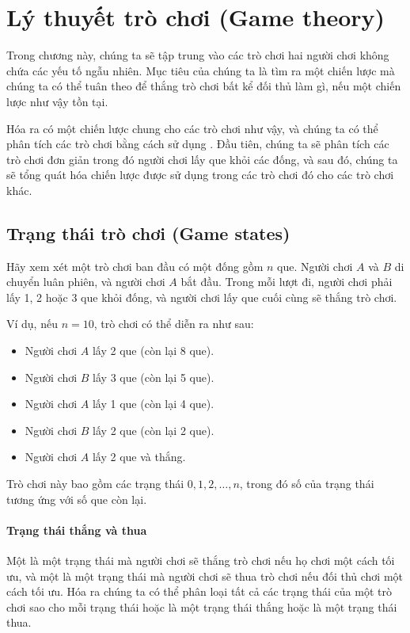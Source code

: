 \chapter{Lý thuyết trò chơi (Game theory)}

Trong chương này, chúng ta sẽ tập trung vào các trò chơi
hai người chơi không chứa các yếu tố ngẫu nhiên.
Mục tiêu của chúng ta là tìm ra một chiến lược mà chúng ta có thể
tuân theo để thắng trò chơi
bất kể đối thủ làm gì,
nếu một chiến lược như vậy tồn tại.

Hóa ra có một chiến lược chung
cho các trò chơi như vậy,
và chúng ta có thể phân tích các trò chơi bằng cách sử dụng .
Đầu tiên, chúng ta sẽ phân tích các trò chơi đơn giản trong đó
người chơi lấy que khỏi các đống,
và sau đó, chúng ta sẽ tổng quát hóa chiến lược
được sử dụng trong các trò chơi đó cho các trò chơi khác.

\section{Trạng thái trò chơi (Game states)}

Hãy xem xét một trò chơi ban đầu có
một đống gồm $n$ que.
Người chơi $A$ và $B$ di chuyển luân phiên,
và người chơi $A$ bắt đầu.
Trong mỗi lượt đi, người chơi phải lấy
1, 2 hoặc 3 que khỏi đống,
và người chơi lấy que cuối cùng sẽ thắng trò chơi.

Ví dụ, nếu $n=10$, trò chơi có thể diễn ra như sau:
\begin{itemize}[noitemsep]
\item Người chơi $A$ lấy 2 que (còn lại 8 que).
\item Người chơi $B$ lấy 3 que (còn lại 5 que).
\item Người chơi $A$ lấy 1 que (còn lại 4 que).
\item Người chơi $B$ lấy 2 que (còn lại 2 que).
\item Người chơi $A$ lấy 2 que và thắng.
\end{itemize}

Trò chơi này bao gồm các trạng thái $0,1,2,\ldots,n$,
trong đó số của trạng thái tương ứng với
số que còn lại.

\subsubsection{Trạng thái thắng và thua}


Một  là một trạng thái mà
người chơi sẽ thắng trò chơi nếu họ
chơi một cách tối ưu,
và một  là một trạng thái
mà người chơi sẽ thua trò chơi nếu
đối thủ chơi một cách tối ưu.
Hóa ra chúng ta có thể phân loại tất cả các trạng thái
của một trò chơi sao cho mỗi trạng thái hoặc là
một trạng thái thắng hoặc là một trạng thái thua.

